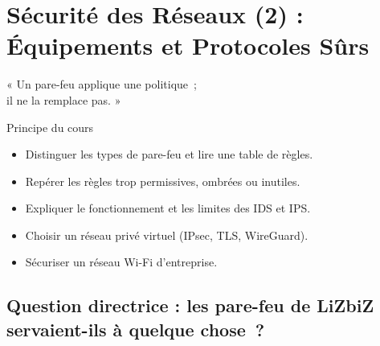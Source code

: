 
\chapter{Sécurité des Réseaux (2) : Équipements et Protocoles Sûrs}
\label{chap:reseaux2}

\epigraph{%
    « Un pare-feu applique une politique~;\\
    il ne la remplace pas. »%
}{Principe du cours}


\begin{boxobjectifs}
\begin{itemize}
    \item Distinguer les types de pare-feu et lire une table de règles.
    \item Repérer les règles trop permissives, ombrées ou inutiles.
    \item Expliquer le fonctionnement et les limites des IDS et IPS.
    \item Choisir un réseau privé virtuel (IPsec, TLS, WireGuard).
    \item Sécuriser un réseau Wi-Fi d'entreprise.
\end{itemize}
\end{boxobjectifs}

\bigskip

\section*{Question directrice : les pare-feu de LiZbiZ servaient-ils à quelque chose~?}

